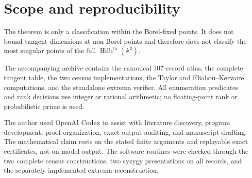 \documentclass[11pt]{article}
\begin{document}
\section{Scope and reproducibility}

The theorem is only a classification within the Borel-fixed points.  It
does not bound tangent dimensions at non-Borel points and therefore does not
classify the most singular points of the full
$\operatorname{Hilb}^{15}(\mathbb A^3)$.

The accompanying archive contains the canonical $107$-record atlas, the
complete tangent table, the two census implementations, the Taylor and
Eliahou--Kervaire computations, and the standalone extrema verifier.  All
enumeration predicates and rank decisions use integer or rational
arithmetic; no floating-point rank or probabilistic prime is used.

The author used OpenAI Codex to assist with literature discovery, program
development, proof organization, exact-output auditing, and manuscript
drafting.  The mathematical claim rests on the stated finite arguments and
replayable exact certificates, not on model output.  The software routines
were checked through the two complete census constructions, two syzygy
presentations on all records, and the separately implemented extrema
reconstruction.



\end{document}
